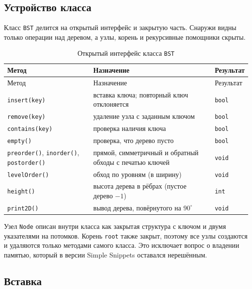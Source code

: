 \documentclass[otchet]{SCWorks}
\begin{document}
\subsection{Устройство класса}

Класс \texttt{BST} делится на открытый интерфейс и закрытую часть.
Снаружи видны только операции над деревом, а узлы, корень и рекурсивные
помощники скрыты.

\begin{longtable}{|p{}|p{}|p{}|}
  \caption{Открытый интерфейс класса \texttt{BST}}
  \label{tab:interface} \\
  \hline
  Метод & Назначение & Результат \\ \hline
  \endfirsthead
  \hline
  Метод & Назначение & Результат \\ \hline
  \endhead
  \texttt{insert(key)}   & вставка ключа; повторный ключ отклоняется & \texttt{bool} \\ \hline
  \texttt{remove(key)}   & удаление узла с заданным ключом & \texttt{bool} \\ \hline
  \texttt{contains(key)} & проверка наличия ключа & \texttt{bool} \\ \hline
  \texttt{empty()}       & проверка, что дерево пусто & \texttt{bool} \\ \hline
  \texttt{preorder()}, \texttt{inorder()}, \texttt{postorder()} &
      прямой, симметричный и обратный обходы с печатью ключей & \texttt{void} \\ \hline
  \texttt{levelOrder()}  & обход по уровням (в ширину) & \texttt{void} \\ \hline
  \texttt{height()}      & высота дерева в рёбрах (пустое дерево $-1$) & \texttt{int} \\ \hline
  \texttt{print2D()}     & вывод дерева, повёрнутого на $90^\circ$ & \texttt{void} \\ \hline
\end{longtable}

Узел \texttt{Node} описан внутри класса как закрытая структура с ключом и
двумя указателями на потомков. Корень \texttt{root} также закрыт, поэтому
все узлы создаются и удаляются только методами самого класса. Это
исключает вопрос о владении памятью, который в версии Simple Snippets
оставался нерешённым.

\subsection{Вставка}
\end{document}
